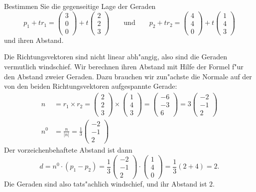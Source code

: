 Bestimmen Sie die gegenseitige Lage der Geraden
\[
p_1+tr_1
=
\begin{pmatrix} 3\\ 0\\ 0 \end{pmatrix}
+t
\begin{pmatrix} 2\\ 2\\ 3 \end{pmatrix}
\qquad
\text{und}
\qquad
p_2+tr_2
=
\begin{pmatrix} 4\\ 4\\ 0 \end{pmatrix}
+t
\begin{pmatrix} 1\\ 4\\ 3 \end{pmatrix}
\]
und ihren Abstand.

\begin{loesung}
Die Richtungsvektoren sind nicht linear abh"angig, also sind
die Geraden vermutlich windschief. Wir berechnen ihren Abstand mit
Hilfe der Formel f"ur den Abstand zweier Geraden. Dazu brauchen
wir zun"achste die Normale auf der von den beiden Richtungsvektoren
aufgespannte Gerade:
\begin{align*}
n&=r_1\times r_2 =\begin{pmatrix} 2\\ 2\\ 3 \end{pmatrix}
\times
\begin{pmatrix} 1\\ 4\\ 3 \end{pmatrix}
=
\begin{pmatrix} -6\\-3\\6 \end{pmatrix}
=3
\begin{pmatrix} -2\\-1\\2 \end{pmatrix}
\\
n^0&=\frac{n}{|n|}=
\frac13
\begin{pmatrix} -2\\-1\\2 \end{pmatrix}
\end{align*}
Der vorzeichenbehaftete Abstand ist dann
\[
d=n^0\cdot(p_1-p_2)=
\frac13
\begin{pmatrix} -2\\-1\\2 \end{pmatrix}
\cdot
\begin{pmatrix} 1\\ 4\\0\end{pmatrix}
=\frac13(2+4)=2.
\]
Die Geraden sind also tats"achlich windschief, und
ihr Abstand ist $2$.
\end{loesung}


